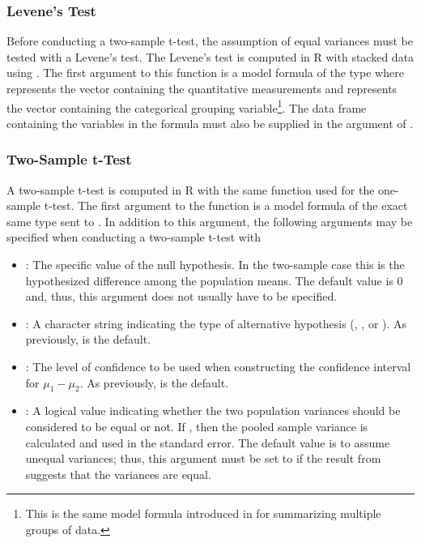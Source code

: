 \documentclass[10pt,openany]{book}\usepackage[]{graphicx}\usepackage[]{color}
\begin{document}

\vspace{-12pt}

\subsubsection{Levene's Test}
Before conducting a two-sample t-test, the assumption of equal variances must be tested with a Levene's test.  The Levene's test is computed in R with stacked data using .  The first argument to this function is a model formula of the type  where  represents the vector containing the quantitative measurements and  represents the vector containing the categorical grouping variable\footnote{This is the same model formula introduced in  for summarizing multiple groups of data.}.  The data frame containing the variables in the formula must also be supplied in the  argument of .

\subsubsection{Two-Sample t-Test}
A two-sample t-test is computed in R with the same  function used for the one-sample t-test.  The first argument to the  function is a model formula of the exact same type sent to .  In addition to this argument, the following arguments may be specified when conducting a two-sample t-test with 
\begin{itemize}
  \item {}: The specific value of the null hypothesis.  In the two-sample case this is the hypothesized difference among the population means.  The default value is $0$ and, thus, this argument does not usually have to be specified.
  \item {}: A character string indicating the type of alternative hypothesis (, , or ).  As previously,  is the default.
  \item {}: The level of confidence to be used when constructing the confidence interval for $\mu_{1}-\mu_{2}$.  As previously,  is the default.
  \item {}: A logical value indicating whether the two population variances should be considered to be equal or not.  If , then the pooled sample variance is calculated and used in the standard error.  The default value is to assume unequal variances; thus, this argument must be set to  if the result from  suggests that the variances are equal.
\end{itemize}
\end{document}

